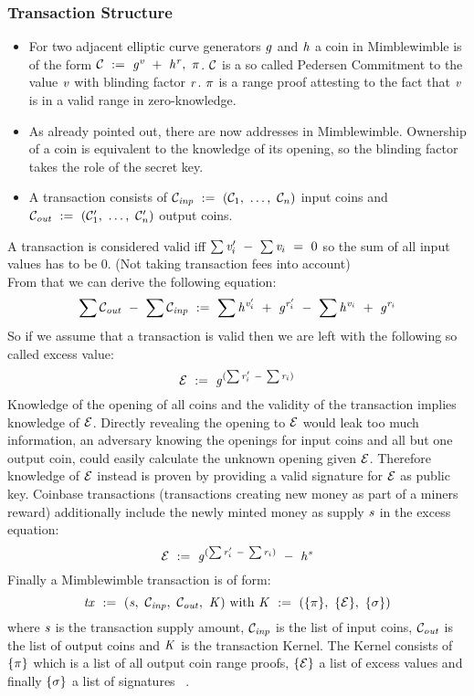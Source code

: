 \subsubsection{Transaction Structure}
\begin{itemize}
    \item For two adjacent elliptic curve generators $\mathit{g}$ and $\mathit{h}$ a coin in Mimblewimble is of the form $\mathcal{C} ~:=~ \mathit{g}^{\mathit{v}} ~+~ \mathit{h}^{\mathit{r}} ,~ \pi$. $\mathcal{C}$ is a so called Pedersen Commitment \cite{pedersen1991non}
    to the value $\mathit{v}$ with blinding factor $\mathit{r}$. $\pi$ is a range proof attesting to the fact that $\mathit{v}$ is in a valid range in zero-knowledge.
    \item As already pointed out, there are now addresses in Mimblewimble. Ownership of a coin is equivalent to the knowledge of its opening, so the blinding factor takes the role of the secret key.
    \item A transaction consists of $\mathcal{C}_{\mathit{inp}} ~:=~ (\mathcal{C}_1 ,~ \dots ,~ \mathcal{C}_n)$ input coins and $\mathcal{C}_{\mathit{out}} ~:=~ (\mathcal{C}'_1 ,~ \dots ,~ \mathcal{C}'_n)$ output coins.
\end{itemize}
A transaction is considered valid iff $\sum{\mathit{v}'_i} ~-~ \sum{\mathit{v}_i} ~=~ 0$ so the sum of all input values has to be 0. (Not taking transaction fees into account)\\
From that we can derive the following equation:
\[ \sum{\mathcal{C}_{\mathit{out}}} ~-~ \sum{\mathcal{C}_{\mathit{inp}}} ~:=~ \sum{\mathit{h}^{\mathit{v}'_i} ~+~\mathit{g}^{\mathit{r}'_i}} ~-~ \sum{\mathit{h}^{\mathit{v}_i} ~+~\mathit{g}^{\mathit{r}_i}} \]
So if we assume that a transaction is valid then we are left with the following so called excess value:
\[ \mathcal{E} ~:=~ \mathit{g}^{(\sum{\mathit{r}'_i} ~-~ \sum{\mathit{r}_i})} \]
Knowledge of the opening of all coins and the validity of the transaction implies knowledge of $\mathcal{E}$.
Directly revealing the opening to $\mathcal{E}$ would leak too much information, an adversary knowing the openings for input coins and all but one output coin, could easily calculate the unknown opening given $\mathcal{E}$.
Therefore knowledge of $\mathcal{E}$ instead is proven by providing a valid signature for $\mathcal{E}$ as public key.
Coinbase transactions (transactions creating new money as part of a miners reward) additionally include the newly minted money as supply $\mathit{s}$ in the excess equation:
\[ \mathcal{E} ~:=~ \mathit{g}^{(\sum{\mathit{r}'_i} ~-~ \sum{\mathit{r}_i})} ~-~ \mathit{h}^{\mathit{s}} \]
Finally a Mimblewimble transaction is of form:
\[ \mathit{tx} ~:=~ (\mathit{s} ,~ \mathcal{C}_{\mathit{inp}} ,~ \mathcal{C}_{\mathit{out}} ,~ \mathit{K})~\text{with}~\mathit{K} ~:=~ (\{\pi\} ,~ \{\mathcal{E}\} ,~ \{\sigma\}) \]
where $\mathit{s}$ is the transaction supply amount, $\mathcal{C}_{\mathit{inp}}$ is the list of input coins, $\mathcal{C}_{\mathit{out}}$ is the list of output coins and $\mathit{K}$ is the transaction Kernel. The Kernel consists of $\{\pi\}$
which is a list of all output coin range proofs, $\{\mathcal{E}\}$ a list of excess values and finally $\{\sigma\}$ a list of signatures ~\cite{fuchsbauer2019aggregate}.

